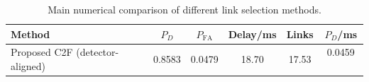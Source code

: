 \begin{table}[t]
    \centering
    \caption{Main numerical comparison of different link selection methods.}
    \label{tab:main_summary}
    \begin{tabular}{l c c c c c}
        \hline
        Method & $P_D$ & $P_{\mathrm{FA}}$ & Delay/ms & Links & $P_D$/ms \\
        \hline
        Proposed C2F (detector-aligned) & 0.8583 & 0.0479 & 18.70 & 17.53 & 0.0459 \
        \hline
    \end{tabular}
\end{table}
